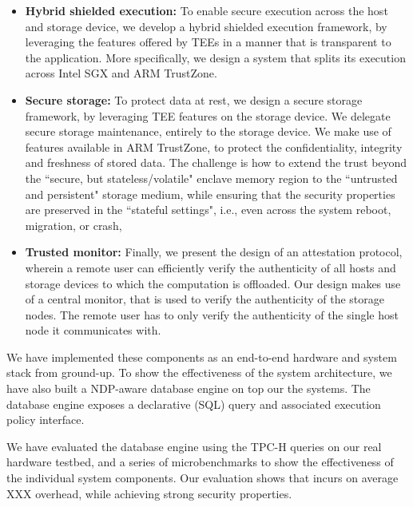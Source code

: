 \begin{itemize}
\item {\bf Hybrid shielded execution:} To enable secure execution across the host and storage device, we develop a hybrid shielded execution framework, by leveraging the features offered by TEEs in a manner that is transparent to the application. More specifically, we design a system that splits its execution across Intel SGX and ARM TrustZone.

\item {\bf Secure storage:} To protect data at rest, we design a secure storage framework, by leveraging TEE features on the storage device. We delegate secure storage maintenance, entirely to the storage device. We make use of features available in ARM TrustZone, to protect the confidentiality, integrity and freshness of stored data. The
challenge is how to extend the trust beyond the “secure, but
stateless/volatile" enclave memory region to the “untrusted
and persistent" storage medium, while ensuring that the
security properties are preserved in the “stateful settings", i.e.,
even across the system reboot, migration, or crash, 

\item {\bf Trusted monitor:} Finally, we present the design of an attestation protocol, wherein a remote user can efficiently verify the authenticity of all hosts and storage devices to which the computation is offloaded. Our design makes use of a central monitor, that is used to verify the authenticity of the storage nodes. The remote user has to only verify the authenticity of the single host node it communicates with.
\end{itemize}



We have implemented these components as an end-to-end hardware and system stack from ground-up. To show the effectiveness of the \project system architecture, we have also built a NDP-aware database engine on top our the systems. The \project database engine exposes a declarative (SQL) query and associated execution policy interface. %


We have evaluated the \project database engine using the TPC-H queries on our real hardware testbed, and a series of microbenchmarks to show the effectiveness of the individual system components. Our evaluation shows that \project incurs on average XXX overhead, while achieving strong security properties. 

